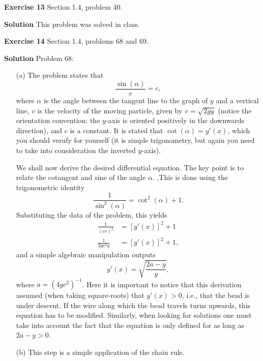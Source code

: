 \documentclass[12pt,oneside]{exam}
\newenvironment{exercise}[1]{\vspace{.1in}\noindent\textbf{Exercise #1 \hspace{.05em}}}{}
\newenvironment{newsolution}{\vspace{.1in}\noindent\textbf{Solution \hspace{.05em}}}{}
\begin{document}
\begin{exercise}{13}
Section 1.4, problem 40. 
\end{exercise}

\begin{newsolution}
This problem was solved in class.
\end{newsolution}

\begin{exercise}{14}
Section 1.4, problems 68 and 69. 
\end{exercise}

\begin{newsolution}
Problem 68:

\begin{itemize}
\item[(a)] The problem states that 
\begin{equation}\label{Snells_law}
\frac{\sin(\alpha)}{v}=c,
\end{equation}
where $\alpha$ is the angle between the tangent line to the graph of $y$ and a vertical line, $v$ is the velocity of the moving particle, given by $v=\sqrt{2gy}$ (notice the orientation convention: the $y$-axis is oriented positively in the downwards direction), and $c$ is a constant. It is stated that $\cot(\alpha)=y'(x)$, which you should verufy for yourself (it is simple trigonometry, but again you need to take into consideration the inverted $y$-axis).  

We shall now derive the desired differential equation. The key point is to relate the cotangent and sine of the angle $\alpha$. ,This is done using the trigonometric identity
\begin{equation*}
\frac{1}{\sin^2(\alpha)} = \cot^2(\alpha) + 1.
\end{equation*}
Substituting the data of the problem, this yields
\begin{align*}
\frac{1}{(cv)^2} & =[y'(x)]^2 +1\\
\frac{1}{2gc^2y} & = [y'(x)]^2 +1,
\end{align*}
and a simple algebraic manipulation outputs
\begin{equation*}
y'(x)= \sqrt{\frac{2a-y}{y}}, 
\end{equation*}
where $a= (4gc^2)^{-1}$. Here it is important to notice that this derivation assumed (when taking square-roots) that $y'(x)>0$, i.e., that the bead is under descent. If the wire along which the bead travels turns upwards, this equation has to be modified. Similarly, when looking for solutions one must take into account the fact that the equation is only defined for as long as $2a-y >0$. 
\item[(b)] This step is a simple application of the chain rule. 
\end{itemize}


\end{newsolution}
\end{document}
